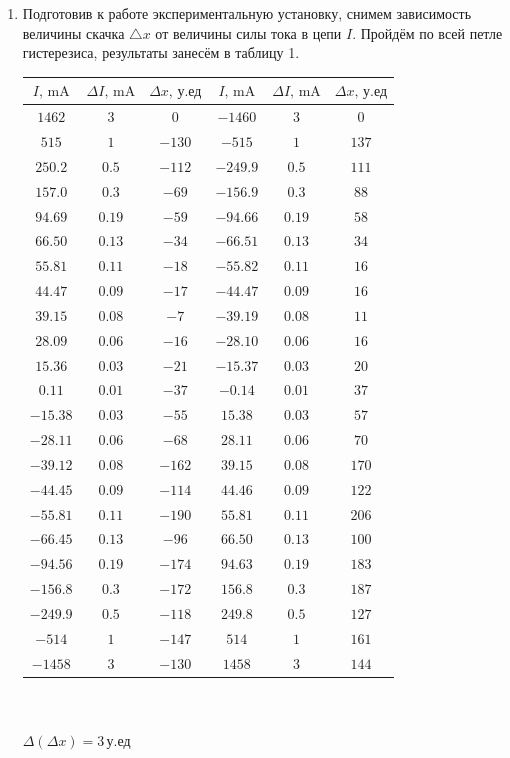 \documentclass[a4paper]{article}
\begin{document}
\begin{enumerate}
    \item Подготовив к работе экспериментальную установку, снимем зависимость величины скачка $\triangle x$ от величины силы тока в цепи $I$. Пройдём по всей петле гистерезиса, результаты занесём в таблицу 1.

    \begin{center}
\begin{tabular}{|c|c|c|c|c|c|}\hline
$I\text{, mA}$&$\Delta I\text{, mA}$&$\Delta x\text{, у.ед}$&$I\text{, mA}$&$\Delta I\text{, mA}$&$\Delta x\text{, у.ед}$\\\hline
$1462$&$3$&$0$&$-1460$&$3$&$0$\\\hline
$515$&$1$&$-130$&$-515$&$1$&$137$\\\hline
$250.2$&$0.5$&$-112$&$-249.9$&$0.5$&$111$\\\hline
$157.0$&$0.3$&$-69$&$-156.9$&$0.3$&$88$\\\hline
$94.69$&$0.19$&$-59$&$-94.66$&$0.19$&$58$\\\hline
$66.50$&$0.13$&$-34$&$-66.51$&$0.13$&$34$\\\hline
$55.81$&$0.11$&$-18$&$-55.82$&$0.11$&$16$\\\hline
$44.47$&$0.09$&$-17$&$-44.47$&$0.09$&$16$\\\hline
$39.15$&$0.08$&$-7$&$-39.19$&$0.08$&$11$\\\hline
$28.09$&$0.06$&$-16$&$-28.10$&$0.06$&$16$\\\hline
$15.36$&$0.03$&$-21$&$-15.37$&$0.03$&$20$\\\hline
$0.11$&$0.01$&$-37$&$-0.14$&$0.01$&$37$\\\hline
$-15.38$&$0.03$&$-55$&$15.38$&$0.03$&$57$\\\hline
$-28.11$&$0.06$&$-68$&$28.11$&$0.06$&$70$\\\hline
$-39.12$&$0.08$&$-162$&$39.15$&$0.08$&$170$\\\hline
$-44.45$&$0.09$&$-114$&$44.46$&$0.09$&$122$\\\hline
$-55.81$&$0.11$&$-190$&$55.81$&$0.11$&$206$\\\hline
$-66.45$&$0.13$&$-96$&$66.50$&$0.13$&$100$\\\hline
$-94.56$&$0.19$&$-174$&$94.63$&$0.19$&$183$\\\hline
$-156.8$&$0.3$&$-172$&$156.8$&$0.3$&$187$\\\hline
$-249.9$&$0.5$&$-118$&$249.8$&$0.5$&$127$\\\hline
$-514$&$1$&$-147$&$514$&$1$&$161$\\\hline
$-1458$&$3$&$-130$&$1458$&$3$&$144$\\\hline
\end{tabular}\\~\\
$\Delta (\Delta x)=3\,\text{у.ед}$
\end{center}



\end{enumerate}
\end{document}
